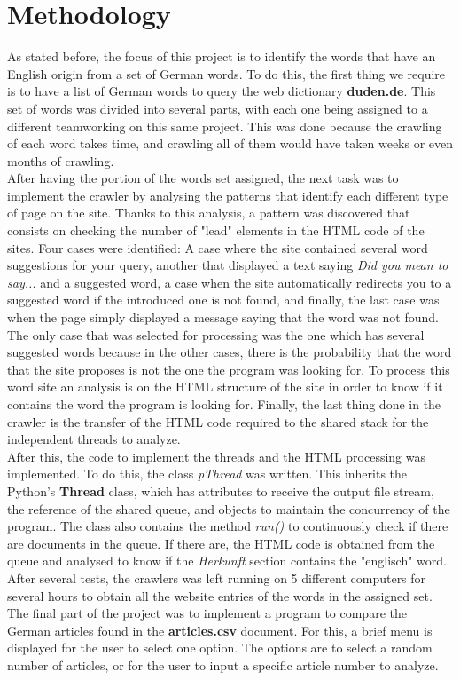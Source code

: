 \documentclass{article}
\begin{document}
\section{Methodology}
As stated before, the focus of this project is to identify the words that have an English origin from a set of German words. To do this, the first thing we require is to have a list of German words to query the web dictionary \textbf{duden.de}. This set of words was divided into several parts, with each one being assigned to a different teamworking on this same project. This was done because the crawling of each word takes time, and crawling all of them would have taken weeks or even months of crawling.\\
After having the portion of the words set assigned, the next task was to implement the crawler by analysing the patterns that identify each different type of page on the site. Thanks to this analysis, a pattern was discovered that consists on checking the number of "lead" elements in the HTML code of the sites. Four cases were identified: A case where the site contained several word suggestions for your query, another that displayed a text saying \textit{Did you mean to say...} and a suggested word, a case when the site automatically redirects you to a suggested word if the introduced one is not found, and finally, the last case was when the page simply displayed a message saying that the word was not found.
The only case that was selected for processing was the one which has several suggested words because in the other cases, there is the probability that the word that the site proposes is not the one the program was looking for. To process this word site an analysis is on the HTML structure of the site in order to know if it contains the word the program is looking for. Finally, the last thing done in the crawler is the transfer of the HTML code required to the shared stack for the independent threads to analyze.
\\
After this, the code to implement the threads and the HTML processing was implemented. To do this, the class \textit{pThread} was written. This inherits the Python's \textbf{Thread} class, which has attributes to receive the output file stream, the reference of the shared queue, and objects to maintain the concurrency of the program. The class also contains the method \textit{run()} to continuously check if there are documents in the queue. If there are, the HTML code is obtained from the queue and analysed to know if the \textit{Herkunft} section contains the "englisch" word.
After several tests, the crawlers was left running on 5 different computers for several hours to obtain all the website entries of the words in the assigned set.
The final part of the project was to implement a program to compare the German articles found in the \textbf{articles.csv} document. For this, a brief menu is displayed for the user to select one option. The options are to select a random number of articles, or for the user to input a specific article number to analyze.
\end{document}

